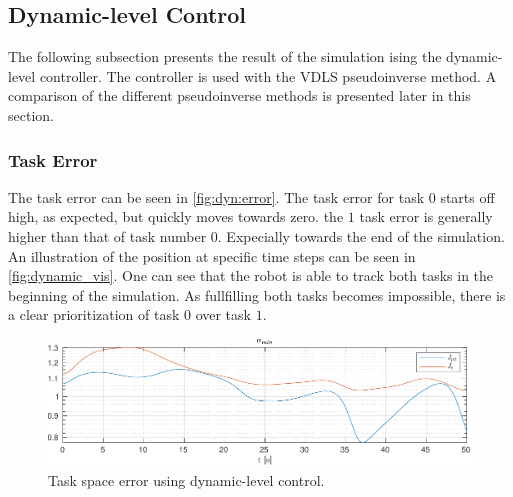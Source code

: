 \FloatBarrier
\subsection{Dynamic-level Control}

The following subsection presents the result of the simulation ising the dynamic-level
controller. The controller is used with the VDLS pseudoinverse method. A comparison
of the different pseudoinverse methods is presented later in this section.

\subsubsection{Task Error}
The task error can be seen in \autoref{fig:dyn:error}. The task error for task $0$
starts off high, as expected, but quickly moves towards zero. the $1$ task error
is generally higher than that of task number $0$. Expecially towards the end of the
simulation. An illustration of the position at specific time steps can be seen in
\autoref{fig:dynamic_vis}. One can see that the robot is able to track both tasks
in the beginning of the simulation. As fullfilling both tasks becomes impossible,
there is a clear prioritization of task $0$ over task $1$.

\begin{figure}[h!]
    \centering
    \includegraphics[page=2,width=\linewidth]{assets/results/dynamic/h5data.pdf}
    \caption{Task space error using dynamic-level control.}
    \label{fig:dyn:error}
\end{figure}

